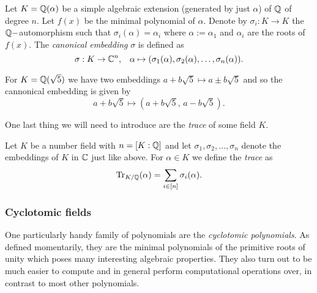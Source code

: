 
\begin{definition}
	Let $K = \mathbb{Q}(\alpha)$ be a simple algebraic extension (generated by just $\alpha$) of $\mathbb{Q}$ of degree $n$. Let $f(x)$ be the minimal polynomial of $\alpha$. Denote by $\sigma_i : K \rightarrow K$ the $\mathbb{Q}-$automorphism such that $\sigma_i(\alpha) = \alpha_i$ where $\alpha := \alpha_1$ and $\alpha_i$ are the roots of $f(x)$. The \textit{canonical embedding} $\sigma$ is defined as
	\[ \sigma : K \rightarrow \mathbb{C}^n, \; \; \; \alpha \mapsto  (\sigma_1(\alpha), \sigma_2(\alpha), \ldots, \sigma_n(\alpha)). \]
\end{definition}

\begin{example}
    For $K = \mathbb{Q}(\sqrt{5})$ we have two embeddings $a+b\sqrt{5} \mapsto a \pm b\sqrt{5}$ and so the cannonical embedding is given by
	\[ a + b\sqrt{5} \mapsto (a + b\sqrt{5},\, a - b\sqrt{5}). \]
\end{example}

One last thing we will need to introduce are the \textit{trace} of some field $K$.

\begin{definition}
	Let $K$ be a number field with $n = [K:\mathbb{Q}]$ and let $\sigma_1, \sigma_2, \ldots, \sigma_n$ denote the embeddings of $K$ in $\mathbb{C}$ just like above. For $\alpha \in K$ we define the \textit{trace} as
	\[ \Tr_{K/\mathbb{Q}}(\alpha) = \sum_{i \in [n]} \sigma_i(\alpha). \]
\end{definition}


\subsubsection*{Cyclotomic fields}
One particularly handy family of polynomials are the \textit{cyclotomic polynomials}. As defined momentarily, they are the minimal polynomials of the primitive roots of unity which poses many interesting algebraic properties. They also turn out to be much easier to compute and in general perform computational operations over, in contrast to most other polynomials.

